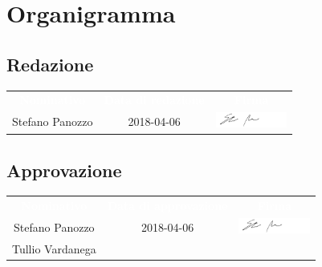 \newpage
\renewcommand{\arraystretch}{1}

\section{Organigramma}

\subsection{Redazione}
\begin{longtable}{ c  c  c }
	\rowcolor{bluSOS}
	\textcolor{white}{\textbf{Nominativo}} & \textcolor{white}{\textbf{Data di redazione}} & \textcolor{white}{\textbf{Firma}}\\
	
	Stefano Panozzo & 2018-04-06 & \includegraphics[height=0.5cm]{img/Firme/StefanoPanozzo.png}  \\
\end{longtable}

\subsection{Approvazione}
\begin{longtable}{ c  c  c }
	\rowcolor{bluSOS}
	\textcolor{white}{\textbf{Nominativo}} & \textcolor{white}{\textbf{Data di approvazione}} & \textcolor{white}{\textbf{Firma}}\\
	
	Stefano Panozzo & 2018-04-06 & \includegraphics[height=0.5cm]{img/Firme/StefanoPanozzo.png}  \\
	
	Tullio Vardanega & & \\
\end{longtable}


